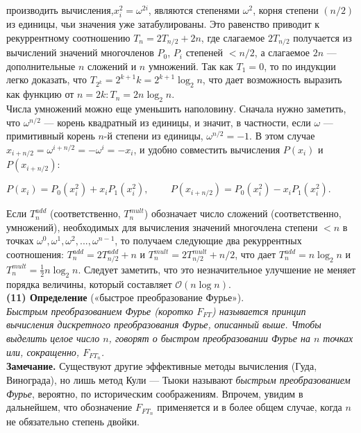 \documentclass{mai_book}
\begin{document}
производить вычисления,$x_i^2=\omega^{2i}$, являются степенями $\omega^2$, корня степени
$(n/2)$ из единицы, чьи значения уже затабулированы. Это равенство
приводит к рекуррентному соотношению $T_n = 2T_{n/2} +2n$, где 
слагаемое $2T_{n/2}$ получается из вычислений значений многочленов $P_0$,
$P_i$ степеней $<n/2$, а слагаемое $2n$ — дополнительные $n$ сложений
и $n$ умножений. Так как $T_1 = 0$, то по индукции легко доказать,
что $T_{2^k}=2^{k+1}k=2^{k+1}\log_2n$, что дает возможность выразить как
функцию от $n = 2k: T_n = 2n\log_2n$.\\
Числа умножений можно еще уменьшить наполовину. Сначала 
нужно заметить, что $\omega^{n/2}$ — корень квадратный из единицы, и значит,
в частности, если $\omega$ — примитивный корень $n$-й степени из 
единицы, $\omega^{n/2}=-1$. В этом случае $x_{i+n/2}=\omega^{i+n/2}=-\omega^i=-x_i$, и
удобно совместить вычисления $P(x_i)$ и $P(x_{i+n/2})$:\smallskip\\
\begin{center}
$P(x_i)=P_0(x_i^2)+x_iP_1(x_i^2),\;\;\;\;\;\;\;\;P(x_{i+n/2})=P_0(x_i^2)-x_iP_1(x_i^2).$
\end{center}\smallskip
Если $T_n^{add}$ (соответственно, $T_n^{mult}$) обозначает число сложений 
(соответственно, умножений), необходимых для вычисления значений
многочлена степени $<n$ в точках $\omega^0,\omega^1,\omega^2,...,\omega^{n-1}$, то 
получаем следующие два рекуррентных соотношения: $T_n^{add}=2T_{n/2}^{add}+n$ и
$T_n^{mult}=2T_{n/2}^{mult}+n/2$, что дает $T_n^{add}= n \log_2 n$ и $T_n^{mult}= \frac{1}{2} n \log_2 n$.
Следует заметить, что это незначительное улучшение не меняет
порядка величины, который составляет $\mathcal{O}(n \log n)$.\smallskip\\
\textbf{(11) Определение} («быстрое преобразование Фурье»).\\
\textit{Быстрым преобразованием Фурье (коротко $F_{FT}$) называется 
принцип вычисления дискретного преобразования Фурье, описанный выше.
Чтобы выделить целое число $n$, говорят о быстром преобразовании 
Фурье на $n$ точках или, сокращенно, $F_{FT_n}$.}\smallskip\\
\textbf{Замечание.} Существуют другие эффективные методы 
вычисления (Гуда, Винограда), но лишь метод Кули — Тыоки 
называют \textit{быстрым преобразованием Фурье}, вероятно, по историческим
соображениям. Впрочем, увидим в дальнейшем, что обозначение
$F_{FT_n}$ применяется и в более общем случае, когда $n$ не 
обязательно степень двойки.\smallskip\\
\end{document}
